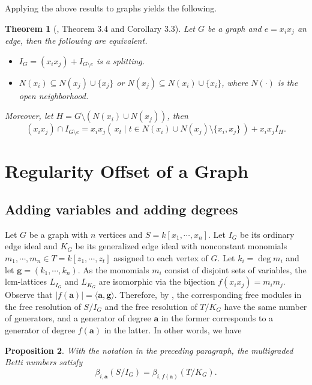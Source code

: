 \documentclass[dvipsnames,10pt]{article}
\newtheorem{theorem}{Theorem}[section]
\newtheorem{proposition}[theorem]{Proposition}
\begin{document}
Applying the above results to graphs yields the following.

\begin{theorem}[\cite{split}, Theorem 3.4 and Corollary 3.3] 
    Let $G$ be a graph and $e=x_ix_j$ an edge, then the following are equivalent.
    \begin{itemize}
        \item $I_G = (x_ix_j) + I_{G\setminus e}$ is a splitting.
        \item $N(x_i)\subseteq N(x_j)\cup \{x_j\}$ or $N(x_j)\subseteq N(x_i)\cup \{x_i\}$, where $N(\cdot)$ is the open neighborhood.
    \end{itemize}
    Moreover, let $H=G\setminus(N(x_i)\cup N(x_j))$, then
    \begin{equation*}
        (x_ix_j)\cap I_{G\setminus e} = x_ix_j(\, x_t\mid t\in N(x_i)\cup N(x_j)\setminus \{x_i,x_j\}\,) + x_ix_jI_H.
    \end{equation*}
\end{theorem}

\section{Regularity Offset of a Graph}
\subsection{Adding variables and adding degrees} \label{avad}


Let $G$ be a graph with $n$ vertices and $S=k[x_1,\cdots,x_n]$. Let $I_G$ be its ordinary edge ideal and $K_G$ be its generalized edge ideal with nonconstant monomials $m_1,\cdots,m_n\in T=k[z_1,\cdots,z_t]$ assigned to each vertex of $G$. Let $k_i=\deg m_i$ and let $\mathbf{g}=(k_1,\cdots,k_n)$. As the monomials $m_i$ consist of disjoint sets of variables, the lcm-lattices $L_{I_G}$ and $L_{K_G}$ are isomorphic via the bijection $f(x_ix_j)=m_im_j$.  Observe that $|f(\mathbf{a})|=\langle\mathbf{a}, \mathbf{g}\rangle$. Therefore, by , the corresponding free modules in the free resolution of $S/I_G$ and the free resolution of $T/K_G$ have the same number of generators, and a generator of degree $\mathbf{a}$ in the former corresponds to a generator of degree $f(\mathbf{a})$ in the latter. In other words, we have

\begin{proposition}
    With the notation in the preceding paragraph, the multigraded Betti numbers satisfy
    \begin{equation*}
        \beta_{i,\mathbf{a}}(S/I_G) = \beta_{i,f(\mathbf{a})}(T/K_G).
    \end{equation*}
\end{proposition}
\end{document}
